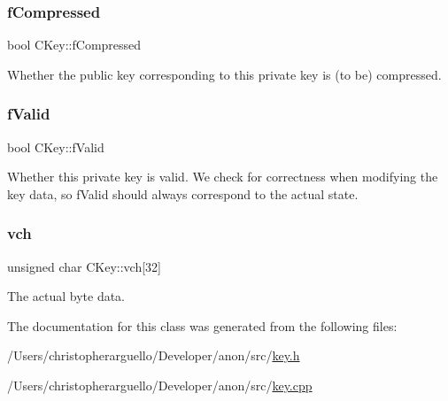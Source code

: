 \subsubsection{\texorpdfstring{f\+Compressed}{fCompressed}}
{\footnotesize\ttfamily bool C\+Key\+::f\+Compressed\hspace{0.3cm}{\ttfamily [private]}}



Whether the public key corresponding to this private key is (to be) compressed. 

\mbox{\label{class_c_key_a78cdd7f831519b5167f6c801f49fa977}} 
\subsubsection{\texorpdfstring{f\+Valid}{fValid}}
{\footnotesize\ttfamily bool C\+Key\+::f\+Valid\hspace{0.3cm}{\ttfamily [private]}}

Whether this private key is valid. We check for correctness when modifying the key data, so f\+Valid should always correspond to the actual state. \mbox{\label{class_c_key_a07f9e2b043670dfbaa9b7b4e782ed116}} 
\subsubsection{\texorpdfstring{vch}{vch}}
{\footnotesize\ttfamily unsigned char C\+Key\+::vch\mbox{[}32\mbox{]}\hspace{0.3cm}{\ttfamily [private]}}



The actual byte data. 



The documentation for this class was generated from the following files\+:\begin{DoxyCompactItemize}
\item 
/\+Users/christopherarguello/\+Developer/anon/src/\mbox{\hyperlink{key_8h}{key.\+h}}\item 
/\+Users/christopherarguello/\+Developer/anon/src/\mbox{\hyperlink{key_8cpp}{key.\+cpp}}\end{DoxyCompactItemize}
